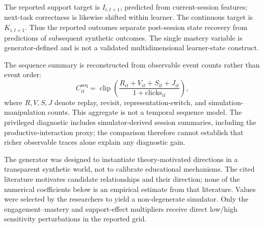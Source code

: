 \documentclass[11pt]{article}
\newcommand{\clip}{\operatorname{clip}}
\begin{document}
The reported support target is $I_{i,t+1}$, predicted from current-session features; next-task correctness is likewise shifted within learner. The continuous target is $K_{i,t+1}$. Thus the reported outcomes separate post-session state recovery from predictions of subsequent synthetic outcomes. The single mastery variable is generator-defined and is not a validated multidimensional learner-state construct.

The sequence summary is reconstructed from observable event counts rather than event order:
\begin{equation}
C_{it}^{\mathrm{seq}} = \clip\left(\frac{R_{it} + V_{it} + S_{it} + J_{it}}{1 + \mathrm{clicks}_{it}}\right),
\end{equation}
where $R, V, S, J$ denote replay, revisit, representation-switch, and simulation-manipulation counts. This aggregate is not a temporal sequence model. The privileged diagnostic includes simulator-derived session summaries, including the productive-interaction proxy; the comparison therefore cannot establish that richer observable traces alone explain any diagnostic gain.

The generator was designed to instantiate theory-motivated directions in a transparent synthetic world, not to calibrate educational mechanisms. The cited literature motivates candidate relationships and their direction; none of the numerical coefficients below is an empirical estimate from that literature. Values were selected by the researchers to yield a non-degenerate simulator. Only the engagement–mastery and support-effect multipliers receive direct low/high sensitivity perturbations in the reported grid.
\end{document}
